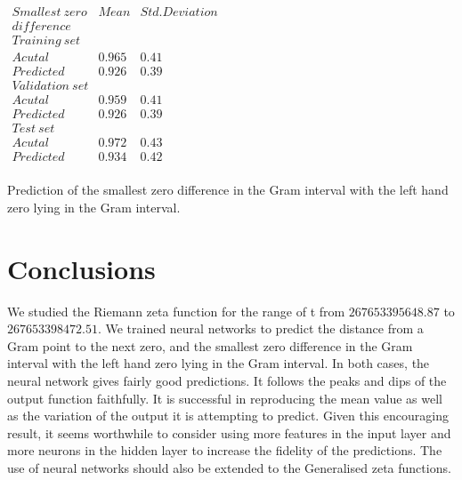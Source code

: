 \documentclass[12pt]{article}
\begin{document}
\begin{table}
\centering \(\begin{array}{c|c|c}
Smallest~zero  & Mean & Std. Deviation \\
difference  &  &  \\
\hline
Training~set \\
\hline
Acutal       & 0.965 &  0.41 \\
Predicted     & 0.926 & 0.39 \\
\hline
Validation~set \\
\hline
Acutal       & 0.959 & 0.41 \\
Predicted     & 0.926 & 0.39 \\
\hline
Test~set \\
\hline
Acutal       & 0.972 & 0.43 \\
Predicted     & 0.934 & 0.42 \\

\end{array}\)
\caption{Prediction of the smallest zero difference in the Gram interval
with the left hand zero lying in the Gram interval.} \label{tab:zeroDiff}
\end{table}



\section{\label{conclusions}Conclusions}

We studied the Riemann zeta function for the range of t from $267653395648.87$ to $267653398472.51$.
We trained neural networks to predict the distance from a 
Gram point to the next zero, and the smallest zero difference in the Gram interval
with the left hand zero lying in the Gram interval.
In both cases, the neural network gives fairly good predictions. 
It follows the peaks and dips of the output function faithfully. It is
successful in reproducing the mean value as well as the variation of the
output it is attempting to predict. Given this encouraging result,
it seems worthwhile to consider using more features in the input layer
and more neurons in the hidden layer to increase the fidelity of the predictions.
The use of neural networks should also be extended to the Generalised zeta functions.
\end{document}
